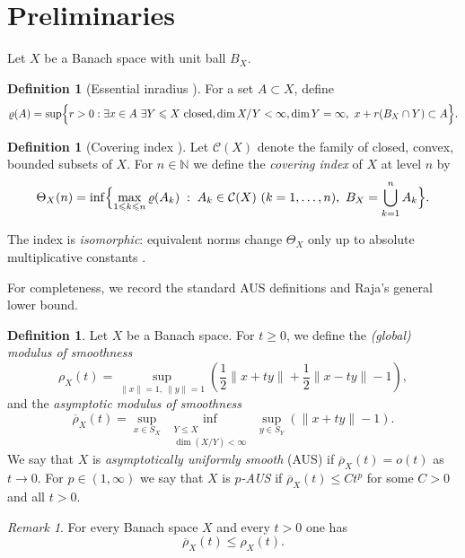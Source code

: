\documentclass[reqno,11pt]{amsart}
\theoremstyle{plain}
\theoremstyle{definition}
\newtheorem{definition}[theorem]{Definition}
\theoremstyle{remark}
\newtheorem{remark}[theorem]{Remark}
\renewcommand{\le}{\leqslant}
\renewcommand{\ge}{\geqslant}
\begin{document}
\section{Preliminaries}\label{sec:Preliminaries}

Let $X$ be a Banach space with unit ball $B_X$.

\begin{definition}[Essential inradius {\cite{RajaCoveringIndex}}]
For a set $A\subset X$, define
\[
\varrho(A)
=
\sup\Bigl\{r>0: \exists x\in A\
   \exists Y\le X\ \text{closed}, \dim X/Y < \infty, \dim Y = \infty,\
   x+r(B_X\cap Y)\subset A\Bigr\}.
\]
\end{definition}


\begin{definition}[Covering index {\cite{RajaCoveringIndex}}]
Let $\mathcal{C}(X)$ denote the family of closed, convex, bounded subsets of $X$.
For $n\in\mathbb{N}$ we define the \emph{covering index} of $X$ at level $n$ by
\[
\Theta_X(n)
=
\inf\Bigl\{
   \max_{1\le k\le n} \varrho(A_k)
   \;:\;
   A_k\in\mathcal{C}(X)\ (k=1,\dots,n),\ 
   B_X = \bigcup_{k=1}^n A_k
\Bigr\}.
\]
\end{definition}


The index is \emph{isomorphic}: equivalent norms change $\Theta_X$ only up to absolute multiplicative constants \cite[Sec.~1]{RajaCoveringIndex}.

For completeness, we record the standard AUS definitions and Raja's general lower bound.

\begin{definition}
Let $X$ be a Banach space. For $t\ge0$, we define the \emph{(global) modulus of smoothness}
\[
\rho_X(t)
=
\sup_{\|x\|=1,\ \|y\|=1}
\left(\frac{1}{2}\|x+ty\| + \frac{1}{2}\|x-ty\| - 1\right),
\]
and the \emph{asymptotic modulus of smoothness}
\[
\overline{\rho}_X(t)
=
\sup_{x\in S_X}\ 
\inf_{\substack{Y\le X\\ \dim(X/Y)<\infty}}\ 
\sup_{y\in S_Y}(\|x+ty\|-1).
\]
We say that $X$ is \emph{asymptotically uniformly smooth} (AUS) if
$\overline{\rho}_X(t)=o(t)$ as $t\to0$.
For $p\in(1,\infty)$ we say that $X$ is \emph{$p$-AUS} if
$\overline{\rho}_X(t)\le C t^p$ for some $C>0$ and all $t>0$.
\end{definition}

\begin{remark}\label{rmrk:modulus}
For every Banach space $X$ and every $t>0$ one has
\[
\overline{\rho}_X(t)\le \rho_X(t).
\]
\end{remark}
\end{document}
